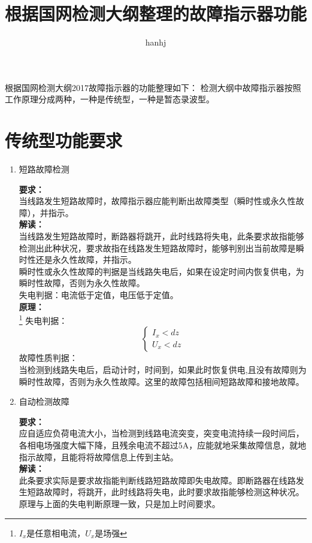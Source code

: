 \documentclass{article}
\begin{document}
\begin{CJK}{UTF8}{gbsn}
\title{根据国网检测大纲整理的故障指示器功能}
\author{hanhj}
\maketitle
根据国网检测大纲2017故障指示器的功能整理如下：
检测大纲中故障指示器按照工作原理分成两种，一种是传统型，一种是暂态录波型。
\section{传统型功能要求}
\begin{enumerate}
\item	短路故障检测
\par
	\textbf{要求：}\\当线路发生短路故障时，故障指示器应能判断出故障类型（瞬时性或永久性故障），并指示。\\
	\textbf{解读：}\\当线路发生短路故障时，断路器将跳开，此时线路将失电，此条要求故指能够检测出此种状况，要求故指在线路发生短路故障时，能够判别出当前故障是瞬时性还是永久性故障，并指示。\\
	瞬时性或永久性故障的判据是当线路失电后，如果在设定时间内恢复供电，为瞬时性故障，否则为永久性故障。\\
	失电判据：电流低于定值，电压低于定值。\\
	\textbf{原理：}\\
	\footnote{$I_x$是任意相电流，$U_x$是场强}
	失电判据：\\
	\[
		\left\{ 
			\begin{array}{ll}
				I_x<dz\\
				U_x<dz 
			\end{array}
		\right.
	\]
	故障性质判据：\\
		当检测到线路失电后，启动计时，时间到，如果此时恢复供电,且没有故障则为瞬时性故障，否则为永久性故障。这里的故障包括相间短路故障和接地故障。
\item	自动检测故障
\par
	\textbf{要求：}\\应自适应负荷电流大小，当检测到线路电流突变，突变电流持续一段时间后，各相电场强度大幅下降，且残余电流不超过5A，应能就地采集故障信息，就地指示故障，且能将将故障信息上传到主站。\\
	\textbf{解读：}\\此条要求实际是要求故指能判断线路短路故障即失电故障。即断路器在线路发生短路故障时，将跳开，此时线路将失电，此时要求故指能够检测这种状况。原理与上面的失电判断原理一致，只是加上时间要求。\\

\end{enumerate}
\end{CJK}
\end{document}
